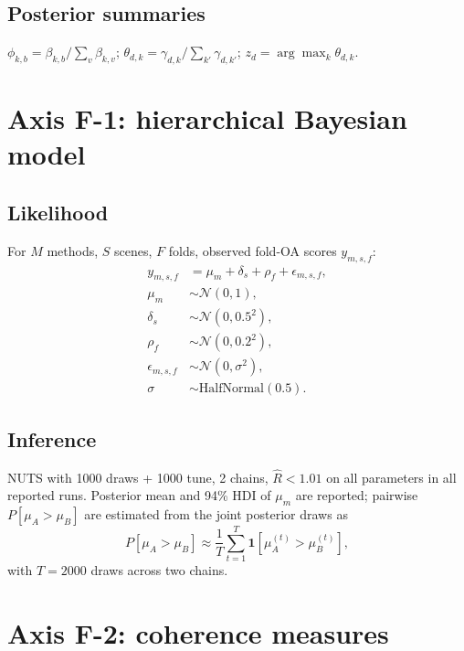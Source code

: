\documentclass[11pt,a4paper]{article}
\begin{document}
\subsection{Posterior summaries}
$\phi_{k,b} = \beta_{k,b} / \sum_v \beta_{k,v}$;
$\theta_{d,k} = \gamma_{d,k} / \sum_{k'} \gamma_{d,k'}$;
$z_d = \arg\max_k \theta_{d,k}$.

\section{Axis F-1: hierarchical Bayesian model}

\subsection{Likelihood}
For $M$ methods, $S$ scenes, $F$ folds, observed fold-OA scores
$y_{m,s,f}$:
\begin{align}
y_{m,s,f}      & = \mu_m + \delta_s + \rho_f + \epsilon_{m,s,f}, \\
\mu_m          & \sim \mathcal{N}(0, 1), \\
\delta_s       & \sim \mathcal{N}(0, 0.5^2), \\
\rho_f         & \sim \mathcal{N}(0, 0.2^2), \\
\epsilon_{m,s,f} & \sim \mathcal{N}(0, \sigma^2), \\
\sigma         & \sim \mathrm{HalfNormal}(0.5).
\end{align}

\subsection{Inference}
NUTS with 1000 draws + 1000 tune, 2 chains, $\hat{R} < 1.01$ on
all parameters in all reported runs. Posterior mean and 94\% HDI of
$\mu_m$ are reported; pairwise $P[\mu_A > \mu_B]$ are estimated from
the joint posterior draws as
\begin{equation}
P[\mu_A > \mu_B] \approx \frac{1}{T} \sum_{t=1}^{T}
\mathbf{1}[\mu_A^{(t)} > \mu_B^{(t)}],
\end{equation}
with $T = 2000$ draws across two chains.

\section{Axis F-2: coherence measures}
\end{document}
